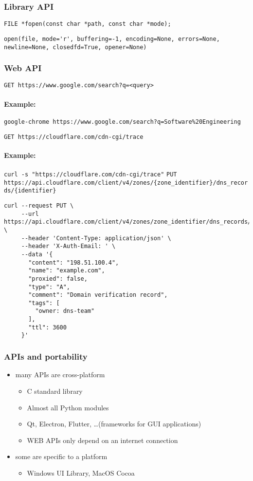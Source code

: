\documentclass[12pt]{article}
\begin{document}
\subsubsection{Library API}

\verb|FILE *fopen(const char *path, const char *mode);|

\verb|open(file, mode='r', buffering=-1, encoding=None, errors=None, newline=None, closedfd=True, opener=None)|

\subsubsection{Web API}

\verb|GET https://www.google.com/search?q=<query>|

\paragraph{Example:}

\verb|google-chrome https://www.google.com/search?q=Software%20Engineering|

\verb|GET https://cloudflare.com/cdn-cgi/trace|

\paragraph{Example:}

\verb|curl -s "https://cloudflare.com/cdn-cgi/trace"|
\texttt{PUT https://api.cloudflare.com/client/v4/zones/\{zone\_identifier\}/dns\_records/\{identifier\}}

\begin{verbatim}
curl --request PUT \
     --url https://api.cloudflare.com/client/v4/zones/zone_identifier/dns_records/identifier \
     --header 'Content-Type: application/json' \
     --header 'X-Auth-Email: ' \
     --data '{
       "content": "198.51.100.4",
       "name": "example.com",
       "proxied": false,
       "type": "A",
       "comment": "Domain verification record",
       "tags": [
         "owner: dns-team"
       ],
       "ttl": 3600
     }'
\end{verbatim}
\subsubsection{APIs and portability}
\begin{itemize}
  \item many APIs are cross-platform
  \begin{itemize}
    \item C standard library
    \item Almost all Python modules
    \item Qt, Electron, Flutter, \ldots (frameworks for GUI applications)
    \item WEB APIs only depend on an internet connection
  \end{itemize}
  \item some are specific to a platform
  \begin{itemize}
    \item Windows UI Library, MacOS Cocoa
  \end{itemize}
\end{itemize}
\end{document}
